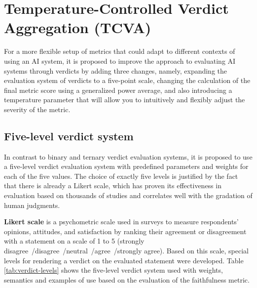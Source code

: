 \documentclass[sn-basic]{sn-jnl}
\theoremstyle{thmstyleone}%
\theoremstyle{thmstyletwo}%
\theoremstyle{thmstylethree}%
\begin{document}
\section{Temperature-Controlled Verdict Aggregation (TCVA)}

For a more flexible setup of metrics that could adapt to different contexts of using an AI system, it is proposed to improve the approach to evaluating AI systems through verdicts by adding three changes, namely, expanding the evaluation system of verdicts to a five-point scale, changing the calculation of the final metric score using a generalized power average, and also introducing a temperature parameter that will allow you to intuitively and flexibly adjust the severity of the metric.

\subsection{Five-level verdict system}

In contrast to binary and ternary verdict evaluation systems, it is proposed to use a five-level verdict evaluation system with predefined parameters and weights for each of the five values. The choice of exactly five levels is justified by the fact that there is already a Likert scale, which has proven its effectiveness in evaluation based on thousands of studies and correlates well with the gradation of human judgments.

\textbf{Likert scale} is a psychometric scale used in surveys to measure respondents' opinions, attitudes, and satisfaction \cite{Likert1932} by ranking their agreement or disagreement with a statement on a scale of 1 to 5 (strongly disagree~/disagree~/neutral~/agree~/strongly agree). Based on this scale, special levels for rendering a verdict on the evaluated statement were developed. Table \ref{tab:verdict-levels} shows the five-level verdict system used with weights, semantics and examples of use based on the evaluation of the faithfulness metric.
\end{document}
